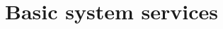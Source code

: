 \newcommand{\ucsUCRV}[1]{Univention Configuration Registry variable \ucsCommand{\ucsBCindex{#1}}}
\newcommand{\ucsCVE}[1]{\href{http://security-tracker.debian.org/tracker/CVE-#1}{CVE-#1}}








\section{Basic system services}



